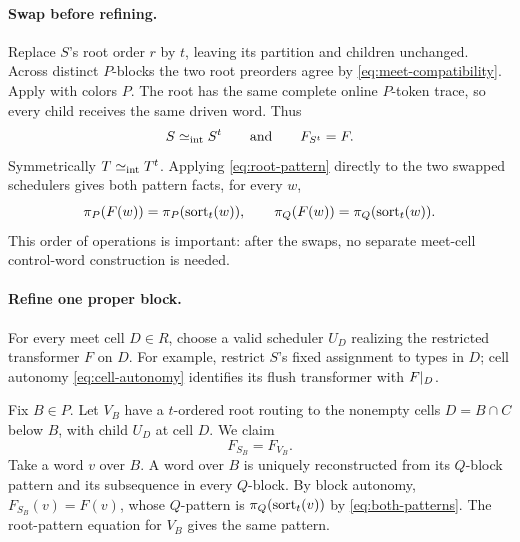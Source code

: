 \paragraph{Swap before refining.}
Replace \(S\)'s root order \(r\) by \(t\), leaving its partition and children
unchanged.  Across distinct \(P\)-blocks the two root preorders agree by
\autoref{eq:meet-compatibility}.  Apply  with colors \(P\).
The root has the same complete online \(P\)-token trace, so every child receives
the same driven word.  Thus
\begin{equation}
  S\mathrel{\simeq_{\mathrm{int}}} S^t
  \qquad\text{and}\qquad
  F_{S^t}=F.
  \label{eq:s-root-swap}
\end{equation}
Symmetrically \(T\mathrel{\simeq_{\mathrm{int}}} T^t\).  Applying
\autoref{eq:root-pattern} directly to the two swapped schedulers gives both pattern
facts, for every \(w\),
\begin{equation}
 \pi_{P}(F(w))=\pi_{P}(\operatorname{sort}_t(w)),
 \qquad
 \pi_{Q}(F(w))=\pi_{Q}(\operatorname{sort}_t(w)).
 \label{eq:both-patterns}
\end{equation}
This order of operations is important: after the swaps, no separate meet-cell
control-word construction is needed.

\paragraph{Refine one proper block.}
For every meet cell \(D\in R\), choose a valid scheduler \(U_D\) realizing the
restricted transformer \(F\) on \(D\).  For example, restrict \(S\)'s fixed
assignment to types in \(D\); cell autonomy
\autoref{eq:cell-autonomy} identifies its flush transformer with
\(F\mathord{|}_{D}\).

Fix \(B\in P\).  Let \(V_B\) have a \(t\)-ordered root routing to the nonempty
cells \(D=B\cap C\) below \(B\), with child \(U_D\) at cell \(D\).  We claim
\begin{equation}
  F_{S_B}=F_{V_B}.
  \label{eq:block-flush-equality}
\end{equation}
Take a word \(v\) over \(B\).  A word over \(B\) is uniquely reconstructed
from its \(Q\)-block pattern and its subsequence in every \(Q\)-block.  By block
autonomy, \(F_{S_B}(v)=F(v)\), whose \(Q\)-pattern is
\(\pi_{Q}(\operatorname{sort}_t(v))\) by \autoref{eq:both-patterns}.  The root-pattern equation
for \(V_B\) gives the same pattern.

